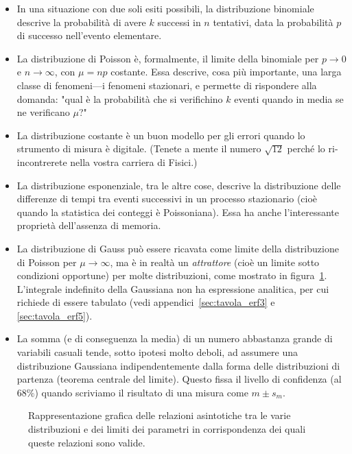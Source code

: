 \begin{itemize}
\item In una situazione con due soli esiti possibili, la distribuzione
  binomiale descrive la probabilità di avere $k$ successi in $n$ tentativi,
  data la probabilità $p$ di successo nell'evento elementare.
\item La distribuzione di Poisson è, formalmente, il limite della binomiale
  per $p \rightarrow 0$ e $n \rightarrow \infty$, con $\mu = np$ costante.
  Essa descrive, cosa più importante, una larga classe di fenomeni---i
  fenomeni stazionari, e permette di rispondere alla domanda: "qual è la
  probabilità che si verifichino $k$ eventi quando in media se ne verificano
  $\mu$?"
\item La distribuzione costante è un buon modello per gli errori quando lo
  strumento di misura è digitale. (Tenete a mente il numero $\sqrt{12}$
  perché lo ri-incontrerete nella vostra carriera di Fisici.)
\item La distribuzione esponenziale, tra le altre cose, descrive la
  distribuzione delle differenze di tempi tra eventi successivi in un processo
  stazionario (cioè quando la statistica dei conteggi è Poissoniana).
  Essa ha anche l'interessante proprietà dell'assenza di memoria.
\item La distribuzione di Gauss può essere ricavata come limite della
  distribuzione di Poisson per $\mu \rightarrow \infty$, ma è in realtà
  un \emph{attrattore} (cioè un limite sotto condizioni opportune) per molte
  distribuzioni, come mostrato in figura~\ref{fig:relazioni_distribuzioni}.
  L'integrale indefinito della Gaussiana non ha espressione analitica, per
  cui richiede di essere tabulato (vedi
  appendici~\ref{sec:tavola_erf3} e \ref{sec:tavola_erf5}).
\item La somma (e di conseguenza la media) di un numero abbastanza grande di
  variabili casuali tende, sotto ipotesi molto deboli, ad assumere una
  distribuzione Gaussiana indipendentemente dalla forma delle distribuzioni di
  partenza (teorema centrale del limite). Questo fissa il livello di confidenza
  (al $68\%$) quando scriviamo il risultato di una misura come $m \pm s_m$.
\end{itemize}

\begin{figure}
  \begin{center}
    
  \end{center}
  \caption{Rappresentazione grafica delle relazioni asintotiche tra le varie
    distribuzioni e dei limiti dei parametri in corrispondenza dei quali
    queste relazioni sono valide.}
  \label{fig:relazioni_distribuzioni}
\end{figure}
